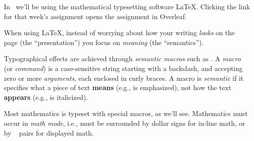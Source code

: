In \Course\ we'll be using the mathematical typesetting software
\LaTeX. Clicking the link for that week's assignment opens the
assignment in Overleaf.

When using \LaTeX, instead of worrying about how your writing
\emph{looks} on the page (the ``presentation'') you focus on
\emph{meaning} (the ``semantics'').

Typographical effects are achieved through \emph{semantic macros} such
as . A \emph{macro} (or \emph{command}) is a case-sensitive
string starting with a backslash, and accepting zero or more
\emph{arguments}, each enclosed in curly braces. A macro is
\emph{semantic} if it specifies what a piece of text \textbf{means}
(e.g., is emphasized), not how the text \textbf{appears} (e.g., is
italicized).

Most mathematics is typeset with special macros, as we'll see.
Mathematics must occur in \emph{math mode}, i.e., must be surrounded
by dollar signs for in-line math, or by \Cmd{[}~\Cmd{]} pairs for
displayed math.

